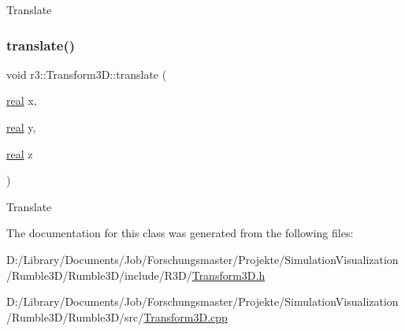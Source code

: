 Translate \mbox{\label{classr3_1_1_transform3_d_aab83077fb0b382391493aa59bdd2ce13}} 
\subsubsection{\texorpdfstring{translate()}{translate()}\hspace{0.1cm}{\footnotesize\ttfamily [2/2]}}
{\footnotesize\ttfamily void r3\+::\+Transform3\+D\+::translate (\begin{DoxyParamCaption}\item[{\mbox{\hyperlink{namespacer3_ab2016b3e3f743fb735afce242f0dc1eb}{real}}}]{x,  }\item[{\mbox{\hyperlink{namespacer3_ab2016b3e3f743fb735afce242f0dc1eb}{real}}}]{y,  }\item[{\mbox{\hyperlink{namespacer3_ab2016b3e3f743fb735afce242f0dc1eb}{real}}}]{z }\end{DoxyParamCaption})}

Translate 

The documentation for this class was generated from the following files\+:\begin{DoxyCompactItemize}
\item 
D\+:/\+Library/\+Documents/\+Job/\+Forschungsmaster/\+Projekte/\+Simulation\+Visualization/\+Rumble3\+D/\+Rumble3\+D/include/\+R3\+D/\mbox{\hyperlink{_transform3_d_8h}{Transform3\+D.\+h}}\item 
D\+:/\+Library/\+Documents/\+Job/\+Forschungsmaster/\+Projekte/\+Simulation\+Visualization/\+Rumble3\+D/\+Rumble3\+D/src/\mbox{\hyperlink{_transform3_d_8cpp}{Transform3\+D.\+cpp}}\end{DoxyCompactItemize}
